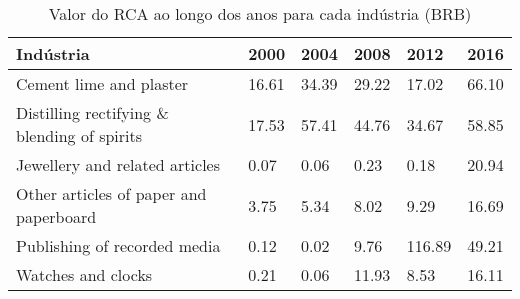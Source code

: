 \begin{table}
\centering
\caption{Valor do RCA ao longo dos anos para cada indústria (BRB)}
\begin{tabular}{p{6cm}p{1.5cm}p{1.5cm}p{1.5cm}p{1.5cm}p{1.5cm}}
\toprule
                                  Indústria &  2000 &  2004 &  2008 &   2012 &  2016 \\
\midrule
                    Cement lime and plaster & 16.61 & 34.39 & 29.22 &  17.02 & 66.10 \\
Distilling rectifying \& blending of spirits & 17.53 & 57.41 & 44.76 &  34.67 & 58.85 \\
             Jewellery and related articles &  0.07 &  0.06 &  0.23 &   0.18 & 20.94 \\
     Other articles of paper and paperboard &  3.75 &  5.34 &  8.02 &   9.29 & 16.69 \\
               Publishing of recorded media &  0.12 &  0.02 &  9.76 & 116.89 & 49.21 \\
                         Watches and clocks &  0.21 &  0.06 & 11.93 &   8.53 & 16.11 \\
\bottomrule
\end{tabular}
\end{table}
